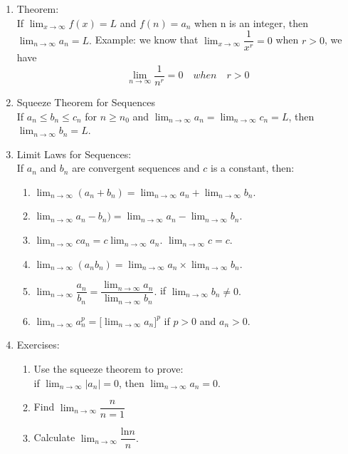 \documentclass[12pt]{amsart}
\begin{document}
\begin{enumerate}
	\item Theorem: \\
	If $\lim_{x \to \infty} f(x) = L$ and $f(n) = a_n$ when n is an integer, then $\lim_{n \to \infty} a_n  = L.$
		Example: we know that $\lim_{x \to \infty} \dfrac{1}{x^r} = 0$ when $r > 0$, we have 
		\[
		\lim_{n \to \infty} \dfrac{1}{n^r} = 0 \quad when \quad r > 0
		\]
	
	\item Squeeze Theorem for Sequences \\
	If $a_n \leq b_n \leq c_n$ for $n \geq n_0$ and $\lim_{n \to \infty}a_n = \lim_{n \to \infty}c_n = L$, then $\lim_{n \to \infty}b_n = L$.
	
	\item Limit Laws for Sequences:\\
		If $a_n$ and $b_n$ are convergent sequences and  $c$ is a constant, then: \\
			\begin{enumerate}
				\item $\lim_{n \to \infty}(a_n + b_n) = \lim_{n \to \infty}a_n + \lim_{n \to \infty}b_n$.
				\item $\lim_{n \to \infty}a_n - b_n) = \lim_{n \to \infty}a_n - \lim_{n \to \infty}b_n$.	
				\item $\lim_{n \to \infty}ca_n = c\lim_{n \to \infty}a_n$. \quad \quad $\lim_{n \to \infty}c = c.$
				\item $\lim_{n \to \infty}(a_nb_n) = \lim_{n \to \infty}a_n \times \lim_{n \to \infty}b_n$.
				\item $ \lim_{n \to \infty} \dfrac{a_n}{b_n} = \dfrac{\lim_{n \to \infty}a_n}{\lim_{n \to \infty}b_n}.$ if $\lim_{n \to \infty}b_n \neq 0.$
				\item $\lim_{n \to \infty}a_n^p = \Bigg[ \lim_{n \to \infty}a_n\Bigg]^p$	if $p > 0$ and $a_n > 0$.
				\end{enumerate}
		
	
	\item Exercises: 
		\begin{enumerate}
		
			\item Use the squeeze theorem to prove: \\
			if $\lim_{n \to \infty}|a_n| = 0$, then $\lim_{n \to \infty}a_n = 0.$ \\
			
			\item Find $\lim_{n \to \infty}\dfrac{n}{n=1}$
			
			
			\item Calculate $\lim_{n \to \infty}\dfrac{\text{ln} n}{n}.$
			

\end{enumerate}
\end{enumerate}
\end{document}
